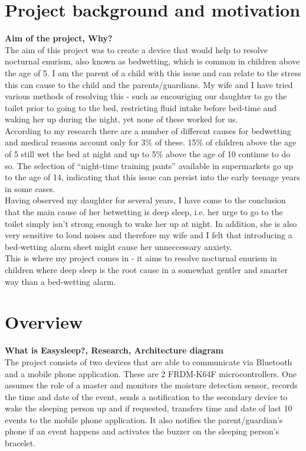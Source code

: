 \documentclass[12pt,a4paper]{article}
\begin{document}
	\section{Project background and motivation}
	{\bfseries Aim of the project, Why?}\\
	The aim of this project was to create a device that would help to resolve nocturnal enurism, also known as bedwetting, which is common in children above the age of 5. I am the parent of a child with this issue and can relate to the stress this can cause to the child and the parents/guardians. My wife and I have tried various methods of resolving this - such as encouriging our daughter to go the toilet prior to going to the bed, restricting fluid intake before bed-time and waking her up during the night, yet none of these worked for us.\\
	
	According to my research there are a number of different causes for bedwetting and medical reasons account only for 3\% of these. 15\% of children above the age of 5 still wet the bed at night and up to 5\% above the age of 10 continue to do so. The selection of ``night-time training pants'' available in supermarkets go up to the age of 14, indicating that this issue can persist into the early teenage years in some cases.\\
	
	Having observed my daughter for several years, I have come to the conclusion that the main cause of her betwetting is deep sleep, i.e. her urge to go to the toilet simply isn't strong enough to wake her up at night. In addition, she is also very sensitive to loud noises and therefore my wife and I felt that introducing a bed-wetting alarm sheet might cause her unneccessary anxiety.\\
	
	This is where my project comes in - it aims to resolve nocturnal enurism in children 
	where deep sleep is the root cause in a somewhat gentler and smarter way than a bed-wetting
	alarm. 
	\newpage
	
	\section{Overview}
	{\bfseries What is Easysleep?, Research, Architecture diagram}\\
	
	The project consists of two devices that are able to communicate via Bluetooth and a mobile phone application. These are 2 FRDM-K64F microcontrollers. One assumes the role of a master and 
	monitors the moisture detection sensor, records the time and date of the event, sends a
	notification to the secondary device to wake the sleeping person up and if requested, 
	transfers time and date of last 10 events to the mobile phone application. It also notifies the 
	parent/guardian's phone if an event happens and activates the buzzer on the sleeping 
	person's bracelet.\\
	
\end{document}
